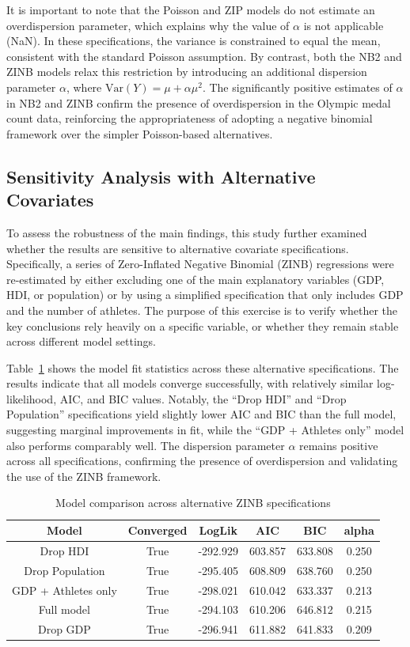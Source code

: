 \documentclass[11pt,twoside]{article}
\numberwithin{Theorem}{section}
\numberwithin{Definition}{section}
\numberwithin{Lemma}{section}
\numberwithin{Algorithm}{section}
\numberwithin{equation}{section}
\begin{document}
It is important to note that the Poisson and ZIP models do not estimate an overdispersion parameter, which explains why the value of $\alpha$ is not applicable (NaN). In these specifications, the variance is constrained to equal the mean, consistent with the standard Poisson assumption. By contrast, both the NB2 and ZINB models relax this restriction by introducing an additional dispersion parameter $\alpha$, where $\text{Var}(Y) = \mu + \alpha \mu^2$. The significantly positive estimates of $\alpha$ in NB2 and ZINB confirm the presence of overdispersion in the Olympic medal count data, reinforcing the appropriateness of adopting a negative binomial framework over the simpler Poisson-based alternatives.

\subsection{Sensitivity Analysis with Alternative Covariates}

To assess the robustness of the main findings, this study further examined whether the results are sensitive to alternative covariate specifications. Specifically, a series of Zero-Inflated Negative Binomial (ZINB) regressions were re-estimated by either excluding one of the main explanatory variables (GDP, HDI, or population) or by using a simplified specification that only includes GDP and the number of athletes. The purpose of this exercise is to verify whether the key conclusions rely heavily on a specific variable, or whether they remain stable across different model settings.

Table~\ref{tab:zinb_alt_specs} shows the model fit statistics across these alternative specifications. The results indicate that all models converge successfully, with relatively similar log-likelihood, AIC, and BIC values. Notably, the ``Drop HDI'' and ``Drop Population'' specifications yield slightly lower AIC and BIC than the full model, suggesting marginal improvements in fit, while the ``GDP + Athletes only'' model also performs comparably well. The dispersion parameter $\alpha$ remains positive across all specifications, confirming the presence of overdispersion and validating the use of the ZINB framework.

\begin{table}[H]
\centering
\caption{Model comparison across alternative ZINB specifications}
\label{tab:zinb_alt_specs}
\begin{tabular}{cccccc}
\hline
Model              & Converged & LogLik   & AIC     & BIC     & alpha \\
\hline
Drop HDI           & True      & -292.929 & 603.857 & 633.808 & 0.250 \\
Drop Population    & True      & -295.405 & 608.809 & 638.760 & 0.250 \\
GDP + Athletes only& True      & -298.021 & 610.042 & 633.337 & 0.213 \\
Full model         & True      & -294.103 & 610.206 & 646.812 & 0.215 \\
Drop GDP           & True      & -296.941 & 611.882 & 641.833 & 0.209 \\
\hline
\end{tabular}
\end{table}
\end{document}
